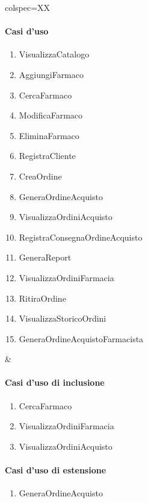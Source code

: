 \begin{table}[h]
	\centering
	\begin{tblr}{colspec=XX}
		\begin{minipage}[t]{\linewidth}
			\paragraph{Casi d'uso}
			\begin{enumerate}
				\item VisualizzaCatalogo %
				\item AggiungiFarmaco %
				\item CercaFarmaco %
				\item ModificaFarmaco %
				\item EliminaFarmaco %
				\item RegistraCliente %
				\item CreaOrdine %
				\item GeneraOrdineAcquisto %
				\item VisualizzaOrdiniAcquisto %
				\item RegistraConsegnaOrdineAcquisto %
				\item GeneraReport %
				\item VisualizzaOrdiniFarmacia %
				\item RitiraOrdine %
				\item VisualizzaStoricoOrdini %
				\item GeneraOrdineAcquistoFarmacista %
			\end{enumerate}
		\end{minipage} &
		\begin{minipage}[t]{\linewidth}
			\paragraph{Casi d'uso di inclusione}
			\begin{enumerate}
				\item CercaFarmaco
				\item VisualizzaOrdiniFarmacia
				\item VisualizzaOrdiniAcquisto
			\end{enumerate}

			\paragraph{Casi d'uso di estensione}
			\begin{enumerate}
				\item GeneraOrdineAcquisto %
			\end{enumerate}
		\end{minipage}
	\end{tblr}
\end{table}

